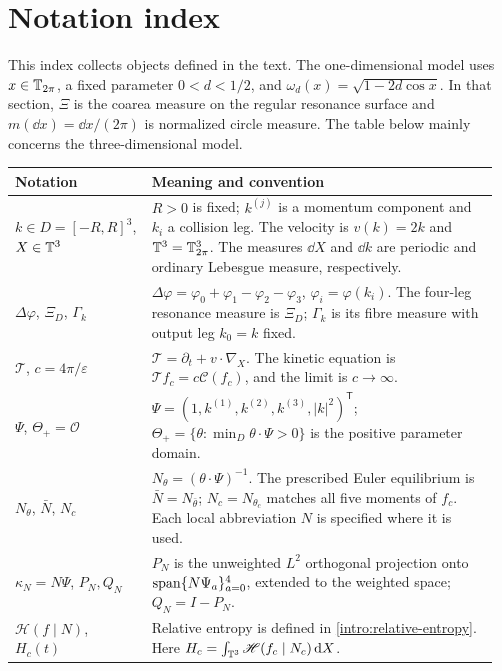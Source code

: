 \section*{Notation index}
\label{intro:notation}

This index collects objects defined in the text. The one-dimensional
model uses $x\in\mathbb T_{2\pi}$, a fixed parameter $0<d<1/2$, and
$\omega_d(x)=\sqrt{1-2d\cos x}$. In that section, $\Xi$ is the coarea
measure on the regular resonance surface and
$m(\dd x)=\dd x/(2\pi)$ is normalized circle measure.
The table below mainly concerns the three-dimensional model.

\begingroup
\small
\renewcommand{\arraystretch}{1.25}
\begin{longtable}{@{}p{0.27\linewidth}p{0.69\linewidth}@{}}
\toprule
Notation & Meaning and convention\\
\midrule
\endhead
$k\in D=[-R,R]^3$, $X\in\mathbb T^3$
 & $R>0$ is fixed; $k^{(j)}$ is a momentum component and $k_i$ a collision
   leg. The velocity is $v(k)=2k$ and $\mathbb T^3=\mathbb T_{2\pi}^3$.
   The measures $\dd X$ and $\dd k$ are periodic and ordinary
   Lebesgue measure, respectively.\\
$\Delta\varphi$, $\Xi_D$, $\Gamma_k$
 & $\Delta\varphi=\varphi_0+\varphi_1-\varphi_2-\varphi_3$,
   $\varphi_i=\varphi(k_i)$. The four-leg resonance measure is $\Xi_D$;
   $\Gamma_k$ is its fibre measure with output leg $k_0=k$ fixed.\\
$\mathcal T$, $c=4\pi/\varepsilon$
 & $\mathcal T=\partial_t+v\cdot\nabla_X$.
   The kinetic equation is $\mathcal Tf_c=c\mathcal C(f_c)$, and
   the limit is $c\to\infty$.\\
$\Psi$, $\Theta_+=\mathcal O$
 & $\Psi=(1,k^{(1)},k^{(2)},k^{(3)},|k|^2)^{\mathsf T}$;
   $\Theta_+=\{\theta:\min_D\theta\cdot\Psi>0\}$ is the positive
   parameter domain.\\
$N_\theta$, $\bar N$, $N_c$
 & $N_\theta=(\theta\cdot\Psi)^{-1}$.
   The prescribed Euler equilibrium is $\bar N=N_{\bar\theta}$;
   $N_c=N_{\theta_c}$ matches all five moments of $f_c$.
   Each local abbreviation $N$ is specified where it is used.\\
$\kappa_N=N\Psi$, $P_N,Q_N$
 & $P_N$ is the unweighted $L^2$ orthogonal projection onto
   $\operatorname{span}\{N\Psi_a\}_{a=0}^4$, extended to the weighted space;
   $Q_N=I-P_N$.\\
$\mathscr H(f\mid N)$, $H_c(t)$
 & Relative entropy is defined in \eqref{intro:relative-entropy}.
   Here $H_c=\int_{\mathbb T^3}\mathscr H(f_c\mid N_c)\,\mathrm d X$.

\end{longtable}
